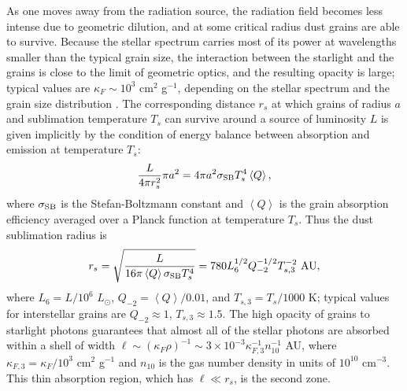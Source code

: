 \documentclass[useAMS,usenatbib]{mn2e}
\newcommand{\Q}{\left\langle Q\right\rangle}
\newcommand{\ssb}{\sigma_{\rm SB}}
\begin{document}
As one moves away from the radiation source, the radiation field becomes less intense due to geometric dilution, and at some critical radius dust grains are able to survive. Because the stellar spectrum carries most of its power at wavelengths smaller than the typical grain size, the interaction between the starlight and the grains is close to the limit of geometric optics, and the resulting opacity is large; typical values are $\kappa_F \sim 10^3$ cm$^2$ g$^{-1}$, depending on the stellar spectrum and the grain size distribution \citep{wolfire86a}. The corresponding distance $r_s$ at which grains of radius $a$ and sublimation temperature $T_s$ can survive around a source of luminosity $L$ is given implicitly by the condition of energy balance between absorption and emission at temperature $T_s$:
\begin{equation}
\frac{L}{4\pi r_s^2} \pi a^2 = 4 \pi a^2 \ssb T_s^4 \Q,
\end{equation}
where $\sigma_{\rm SB}$ is the Stefan-Boltzmann constant and $\Q$ is the grain absorption efficiency averaged over a Planck function at temperature $T_s$. Thus the dust sublimation radius is
\begin{equation}
r_s = \sqrt{\frac{L}{16\pi \Q \ssb T_s^4}}
= 780 L_6^{1/2} Q_{-2}^{-1/2} T_{s,3}^{-2}\mbox{ AU},
\end{equation}
where $L_6 = L/10^6$ $L_\odot$, $Q_{-2} = \Q/0.01$, and $T_{s,3} = T_s/1000$ K; typical values for interstellar grains are $Q_{-2}\approx 1$, $T_{s,3}\approx 1.5$. The high opacity of grains to starlight photons guarantees that almost all of the stellar photons are absorbed within a shell of width $\ell \sim (\kappa_F \rho)^{-1} \sim 3 \times 10^{-3}\kappa_{F,3}^{-1} n_{10}^{-1}$ AU, where $\kappa_{F,3} = \kappa_F/10^3$ cm$^2$ g$^{-1}$ and $n_{10}$ is the gas number density in units of $10^{10}$ cm$^{-3}$. This thin absorption region, which has $\ell \ll r_s$, is the second zone.
\end{document}
